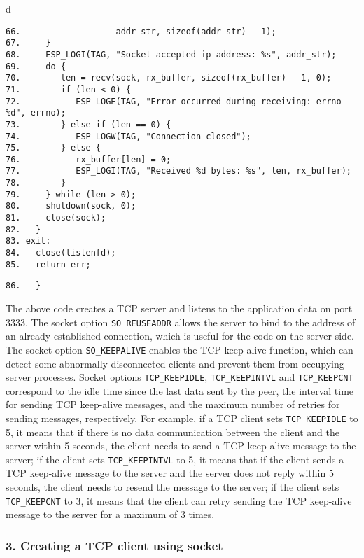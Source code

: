 \documentclass[a4paper,12pt]{book}
\begin{document}
\begin{codebloc}
\begin{tabular}{d}
\vspace{2pt}
\begin{verbatim}
66.                   addr_str, sizeof(addr_str) - 1);
67.     }
68.     ESP_LOGI(TAG, "Socket accepted ip address: %s", addr_str);
69.     do {
70.        len = recv(sock, rx_buffer, sizeof(rx_buffer) - 1, 0);
71.        if (len < 0) {
72.           ESP_LOGE(TAG, "Error occurred during receiving: errno %d", errno);
73.        } else if (len == 0) {
74.           ESP_LOGW(TAG, "Connection closed");
75.        } else {
76.           rx_buffer[len] = 0;
77.           ESP_LOGI(TAG, "Received %d bytes: %s", len, rx_buffer);
78.        }
79.     } while (len > 0);
80.     shutdown(sock, 0);
81.     close(sock);
82.   }
83.	exit:
84.   close(listenfd);
85.   return err;
\end{verbatim}
\verb|86.	}|
\end{tabular}
\end{codebloc}

The above code creates a TCP server and listens to the application data on port 3333. The socket option \verb|SO_REUSEADDR| allows the server to bind to the address of an already established connection, which is useful for the code on the server side. The socket option \verb|SO_KEEPALIVE| enables the TCP keep-alive function, which can detect some abnormally disconnected clients and prevent them from occupying server processes. Socket options \verb|TCP_KEEPIDLE|, \verb|TCP_KEEPINTVL| and \verb|TCP_KEEPCNT| correspond to the idle time since the last data sent by the peer, the interval time for sending TCP keep-alive messages, and the maximum number of retries for sending messages, respectively. For example, if a TCP client sets \verb|TCP_KEEPIDLE| to 5, it means that if there is no data communication between the client and the server within 5 seconds, the client needs to send a TCP keep-alive message to the server; if the client sets \verb|TCP_KEEPINTVL| to 5, it means that if the client sends a TCP keep-alive message to the server and the server does not reply within 5 seconds, the client needs to resend the message to the server; if the client sets \verb|TCP_KEEPCNT| to 3, it means that the client can retry sending the TCP keep-alive message to the server for a maximum of 3 times.

\subsubsection{3. Creating a TCP client using socket}
\end{document}
